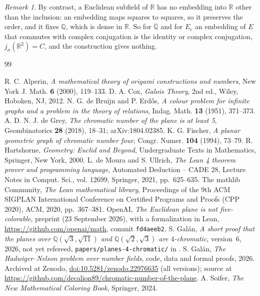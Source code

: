 \documentclass[11pt,a4paper]{amsart}
\theoremstyle{remark}
\newtheorem*{remark}{Remark}
\newcommand{\Q}{\mathbb{Q}}
\newcommand{\R}{\mathbb{R}}
\newcommand{\Ec}{E_{\mathrm{c}}}
\begin{document}
\begin{remark}
By contrast, a Euclidean subfield of $\R$ has no embedding into $\R$ other than the inclusion: an embedding maps
squares to squares, so it preserves the order, and it fixes $\Q$, which is dense in $\R$. So for $\overline{\Q}$ and
for $\Ec$ an embedding of $E$ that commutes with complex conjugation is the identity or complex conjugation, $j_\sigma(\R^2)=C$,
and the construction gives nothing.
\end{remark}

\begin{thebibliography}{99}

 R. C. Alperin, \emph{A mathematical theory of origami constructions and numbers}, New York J.
Math. \textbf{6} (2000), 119--133.
 D. A. Cox, \emph{Galois Theory}, 2nd ed., Wiley, Hoboken, NJ, 2012.
 N. G. de Bruijn and P. Erd\H{o}s, \emph{A colour problem for infinite graphs and a problem
in the theory of relations}, Indag. Math. \textbf{13} (1951), 371--373.
 A. D. N. J. de Grey, \emph{The chromatic number of the plane is at least 5}, Geombinatorics
\textbf{28} (2018), 18--31; arXiv:1804.02385.
 K. G. Fischer, \emph{A planar geometric graph of chromatic number four}, Congr. Numer.
\textbf{104} (1994), 73--79.
 R. Hartshorne, \emph{Geometry: Euclid and Beyond}, Undergraduate Texts in Mathematics,
Springer, New York, 2000.
 L. de Moura and S. Ullrich, \emph{The Lean 4 theorem prover and programming language}, Automated
Deduction -- CADE 28, Lecture Notes in Comput. Sci., vol. 12699, Springer, 2021, pp.~625--635.
 The mathlib Community, \emph{The Lean mathematical library}, Proceedings of the 9th ACM SIGPLAN
International Conference on Certified Programs and Proofs (CPP 2020), ACM, 2020, pp.~367--381.
 OpenAI, \emph{The Euclidean plane is not five-colorable}, preprint (23 September 2026), with a
formalization in Lean, \url{https://github.com/openai/math}, commit \texttt{fd4aeeb2}.
 S. Gal\'an, \emph{A short proof that the planes over $\Q(\sqrt3,\sqrt{11})$ and $\Q(\sqrt2,\sqrt3)$
are $4$-chromatic}, version~6, 2026, not yet refereed, \texttt{papers/planes-4-chromatic/} in \cite{Repo}.
 S. Gal\'an, \emph{The Hadwiger--Nelson problem over number fields}, code, data and formal proofs,
2026. Archived at Zenodo, \href{https://doi.org/10.5281/zenodo.22976635}{doi:10.5281/zenodo.22976635} (all
versions); source at \url{https://github.com/decalion89/chromatic-number-of-the-plane}.
 A. Soifer, \emph{The New Mathematical Coloring Book}, Springer, 2024.

\end{thebibliography}
\end{document}

